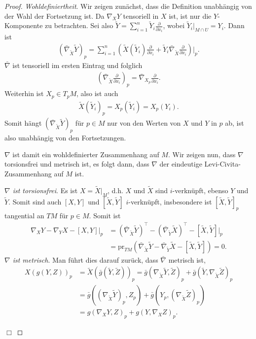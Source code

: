 \documentclass[12pt,a4paper]{article}
\def\pr{\mathrm{pr}}
\def\qed{\quad\hfill\ensuremath{\Box}}
\begin{document}
\begin{proof}
\textit{Wohldefiniertheit}.
Wir zeigen zun\"achst, dass die Definition unabh\"angig von der Wahl der
Fortsetzung ist. Da $\nabla_X Y$ tensoriell in $X$ ist, ist nur die
$Y$-Komponente zu betrachten. Sei also $\tilde{Y} = \sum_{i=1}^n \tilde{Y}_i
\frac{\partial}{\partial x_i}$, wobei $\tilde{Y}_i\big|_{M\cap U} = Y_i$. Dann
ist
\begin{align*}
\left(\bar{\nabla}_{\tilde{X}}\tilde{Y}\right)_p =
\sum_{i=1}^n \left(\tilde{X}(\tilde{Y}_i)\frac{\partial}{\partial x_i}
+ \tilde{Y}_i \bar{\nabla}_{\tilde{X}}\frac{\partial}{\partial x_i}
\right)
\bigg|_p.
\end{align*}
$\bar{\nabla}$ ist tensoriell im ersten Eintrag und folglich 
\begin{align*}
\left(\bar{\nabla}_{\tilde{X}}\frac{\partial}{\partial x_i}\right)_p = 
\bar{\nabla}_{X_p} \frac{\partial}{\partial x_i}.
\end{align*}
Weiterhin ist $X_p\in T_pM$, also ist auch
\begin{align*}
\tilde{X}(\tilde{Y}_i)_p = X_p(\tilde{Y}_i) = X_p(Y_i).
\end{align*}
Somit h\"angt $\left(\bar{\nabla}_{\tilde{X}}\tilde{Y}\right)_p$ f\"ur $p\in M$ nur
von den Werten von $X$ und $Y$ in $p$ ab, ist also unabh\"angig von den
Fortsetzungen.

$\nabla$ ist damit ein wohldefinierter Zusammenhang auf $M$. Wir zeigen nun,
dass $\nabla$ torsionsfrei und metrisch ist, es folgt dann, dass $\nabla$ der
eindeutige Levi-Civita-Zusammenhang auf $M$ ist.

\textit{$\nabla$ ist torsionsfrei}. Es ist $X = \tilde{X}\big|_M$, d.h. $X$ und
$\tilde{X}$ sind $i$-verkn\"upft, ebenso $Y$ und $\tilde{Y}$. Somit sind auch
$[X,Y]$ und $[\tilde{X},\tilde{Y}]$ $i$-verkn\"upft, insbesondere ist
$[\tilde{X},\tilde{Y}]_p$ tangential an $TM$ f\"ur $p\in M$. Somit ist
\begin{align*}
\nabla_X Y - \nabla_Y X - [X,Y]\bigg|_p &= 
\left(\bar{\nabla}_{\tilde{X}}\tilde{Y} \right)^\top
-
\left(\bar{\nabla}_{\tilde{Y}}\tilde{X} \right)^\top
- [\tilde{X},\tilde{Y}]
\bigg|_p\\
&= 
\pr_{TM}\left(\bar{\nabla}_{\tilde{X}}\tilde{Y} -
\bar{\nabla}_{\tilde{Y}}\tilde{X}
- [\tilde{X},\tilde{Y}] 
  \right) = 0.
\end{align*}
\textit{$\nabla$ ist metrisch}. Man f\"uhrt dies darauf zur\"uck, dass
$\bar{\nabla}$ metrisch ist,
\begin{align*}
X(g(Y,Z))_p &= \tilde{X}(\bar{g}(\tilde{Y},\tilde{Z}))_p = 
\bar{g}(\nabla_{\tilde{X}}\tilde{Y},\tilde{Z})_p
+ \bar{g}(\tilde{Y},\nabla_{\tilde{X}}\tilde{Z})_p\\
&= \bar{g}((\nabla_{\tilde{X}}\tilde{Y})_p,Z_p)
+ \bar{g}(Y_p,(\nabla_{\tilde{X}}\tilde{Z})_p)\\
&= g(\nabla_X Y , Z)_p + g(Y,\nabla_X Z)_p. 
\end{align*}

\qed
\end{proof}
\end{document}
